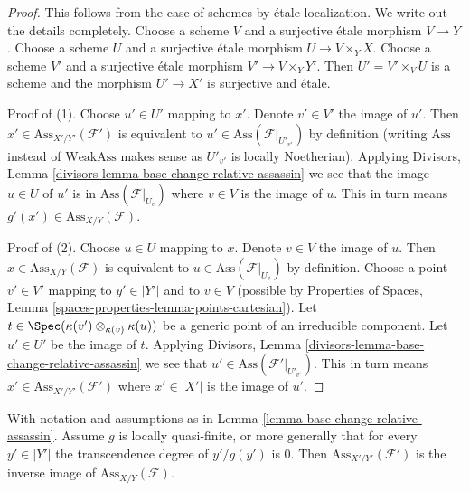 \begin{proof}
This follows from the case of schemes by \'etale localization.
We write out the details completely. Choose a scheme
$V$ and a surjective \'etale morphism $V \to Y$.
Choose a scheme $U$ and a surjective
\'etale morphism $U \to V \times_Y X$. Choose a scheme $V'$
and a surjective \'etale morphism $V' \to V \times_Y Y'$.
Then $U' = V' \times_V U$ is a scheme and the morphism
$U' \to X'$ is surjective and \'etale.

\medskip\noindent
Proof of (1). Choose $u' \in U'$ mapping to $x'$.
Denote $v' \in V'$ the image of $u'$.
Then $x' \in \text{Ass}_{X'/Y'}(\mathcal{F}')$ is
equivalent to $u' \in \text{Ass}(\mathcal{F}|_{U'_{v'}})$
by definition (writing $\text{Ass}$ instead of $\text{WeakAss}$
makes sense as $U'_{v'}$ is locally Noetherian).
Applying Divisors, Lemma \ref{divisors-lemma-base-change-relative-assassin}
we see that the image $u \in U$ of $u'$ is in
$\text{Ass}(\mathcal{F}|_{U_v})$ where $v \in V$ is the image of $u$.
This in turn means $g'(x') \in \text{Ass}_{X/Y}(\mathcal{F})$.

\medskip\noindent
Proof of (2). Choose $u \in U$ mapping to $x$.
Denote $v \in V$ the image of $u$.
Then $x \in \text{Ass}_{X/Y}(\mathcal{F})$ is
equivalent to $u \in \text{Ass}(\mathcal{F}|_{U_v})$
by definition. Choose a point $v' \in V'$ mapping
to $y' \in |Y'|$ and to $v \in V$ (possible by
Properties of Spaces, Lemma \ref{spaces-properties-lemma-points-cartesian}).
Let $t \in \Spec(\kappa(v') \otimes_{\kappa(v)} \kappa(u))$
be a generic point of an irreducible component.
Let $u' \in U'$ be the image of $t$.
Applying Divisors, Lemma \ref{divisors-lemma-base-change-relative-assassin}
we see that $u' \in \text{Ass}(\mathcal{F}'|_{U'_{v'}})$.
This in turn means $x' \in \text{Ass}_{X'/Y'}(\mathcal{F}')$
where $x' \in |X'|$ is the image of $u'$.
\end{proof}

\begin{lemma}
\label{lemma-base-change-relative-assassin-quasi-finite}
With notation and assumptions as in
Lemma \ref{lemma-base-change-relative-assassin}.
Assume $g$ is locally quasi-finite, or more generally that
for every $y' \in |Y'|$ the transcendence degree of $y'/g(y')$ is $0$.
Then $\text{Ass}_{X'/Y'}(\mathcal{F}')$ is the inverse image of
$\text{Ass}_{X/Y}(\mathcal{F})$.
\end{lemma}

